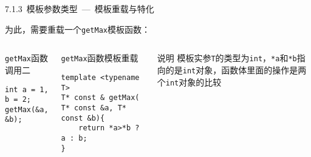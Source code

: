 
\begin{frame}[fragile]{7.1.3~模板参数类型\normalsize{~---~模板重载与特化}}

为此，需要\alert{重载}一个\texttt{getMax}模板函数：

\vspace{-4mm}

\begin{columns}[t]

\begin{blueblock}{\texttt{getMax}函数调用二}
\begin{lstlisting}[moreemph={T}]
int a = 1, b = 2;
getMax(&a, &b);
\end{lstlisting}
\end{blueblock}
\begin{blueblock}{\texttt{getMax}函数模板重载}
\begin{lstlisting}[moreemph={T}]
template <typename T>
T* const & getMax( T* const &a, T* const &b){
    return *a>*b ? a : b;
}
\end{lstlisting}
\end{blueblock}

\begin{yellowblock}{说明}
模板实参\texttt{T}的类型为\texttt{int}，\texttt{*a}和\texttt{*b}指向的是\texttt{int}对象，函数体里面的操作是两个\texttt{int}对象的比较
\end{yellowblock}

\end{columns}

\end{frame}


